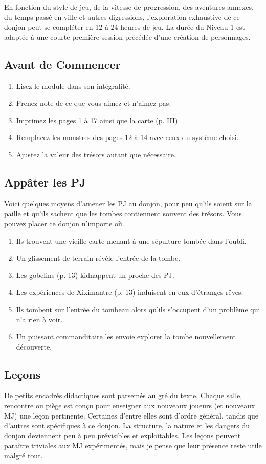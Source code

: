En fonction du style de jeu, de la vitesse de progression, des aventures annexes, du temps passé en ville et autres digressions, l'exploration exhaustive de ce donjon peut se compléter en 12 à 24 heures de jeu. 
La durée du Niveau 1 est adaptée à une courte première session précédée d'une création de personnages.

\subsection{Avant de Commencer}
\begin{enumerate}
  \item Lisez le module dans son intégralité.
  \item Prenez note de ce que vous aimez et n'aimez pas.
  \item Imprimez les pages 1 à 17 ainsi que la carte (p. III).
  \item Remplacez les monstres des pages 12 à 14 avec ceux du système choisi.
  \item Ajustez la valeur des trésors autant que nécessaire.
\end{enumerate}

\subsection{Appâter les PJ}
Voici quelques moyens d'amener les PJ au donjon, pour peu qu'ils soient sur la paille et qu'ils sachent que les tombes
contiennent souvent des trésors. 
Vous pouvez placer ce donjon n'importe où.

\begin{enumerate}
  \item Ils trouvent une vieille carte menant à une sépulture tombée dans l'oubli.
  \item Un glissement de terrain révèle l'entrée de la tombe.
  \item Les gobelins (p. 13) kidnappent un proche des PJ.
  \item Les expériences de Xiximantre (p. 13) induisent en eux d'étranges rêves.
  \item Ils tombent sur l'entrée du tombeau alors qu'ils s'occupent d'un problème qui n'a rien à voir.
  \item Un puissant commanditaire les envoie explorer la tombe nouvellement découverte.
\end{enumerate}

\subsection{Leçons}
De petits encadrés didactiques sont parsemés au gré du texte.
Chaque salle, rencontre ou piège est conçu pour enseigner aux nouveaux joueurs (et nouveaux MJ) une leçon pertinente. Certaines d'entre elles sont d'ordre général, tandis que d'autres sont spécifiques à ce donjon. 
La structure, la nature et les dangers du donjon deviennent peu à peu prévisibles et exploitables. 
Les leçons peuvent paraître triviales aux MJ expérimentés, mais je pense que leur présence reste utile malgré
tout.

